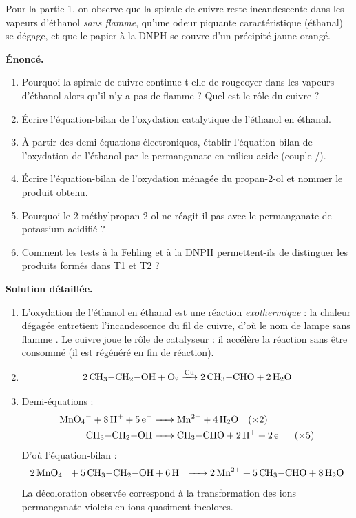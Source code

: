 \documentclass[11pt]{article}
\newcommand{\cle}[1]{{\popxbold\color{popdark}#1}}
\newcounter{popsec}
\newcounter{popsub}
\newcommand{\courssub}[1]{%
  \stepcounter{popsub}%
  \par\vspace{9pt}\noindent{\popxbold\fontsize{11.5}{13}\selectfont\color{popink}{\color{poporange}\thepopsec.\thepopsub}\hspace{6pt}#1}\par\nopagebreak\vspace{4pt}
}
\begin{document}
Pour la partie 1, on observe que la spirale de cuivre reste incandescente dans les vapeurs d'éthanol \emph{sans flamme}, qu'une odeur piquante caractéristique (éthanal) se dégage, et que le papier à la DNPH se couvre d'un précipité jaune-orangé.

\courssub{Exploitation}

\begin{exoresolu}
\textbf{Énoncé.}
\begin{enumerate}
\item Pourquoi la spirale de cuivre continue-t-elle de rougeoyer dans les vapeurs d'éthanol alors qu'il n'y a pas de flamme ? Quel est le rôle du cuivre ?
\item Écrire l'équation-bilan de l'oxydation catalytique de l'éthanol en éthanal.
\item À partir des demi-équations électroniques, établir l'équation-bilan de l'oxydation de l'éthanol par le permanganate en milieu acide (couple /).
\item Écrire l'équation-bilan de l'oxydation ménagée du propan-2-ol et nommer le produit obtenu.
\item Pourquoi le 2-méthylpropan-2-ol ne réagit-il pas avec le permanganate de potassium acidifié ?
\item Comment les tests à la Fehling et à la DNPH permettent-ils de distinguer les produits formés dans T1 et T2 ?
\end{enumerate}
\tcblower
\textbf{Solution détaillée.}
\begin{enumerate}
\item L'oxydation de l'éthanol en éthanal est une réaction \emph{exothermique} : la chaleur dégagée entretient l'incandescence du fil de cuivre, d'où le nom de \og lampe sans flamme \fg. Le cuivre joue le rôle de \cle{catalyseur} : il accélère la réaction sans être consommé (il est régénéré en fin de réaction).
\item \[ 2\,\ce{CH3-CH2-OH} + \ce{O2} \xrightarrow{\ce{Cu}} 2\,\ce{CH3-CHO} + 2\,\ce{H2O} \]
\item Demi-équations :
\begin{align*}
\ce{MnO4- + 8H+ + 5e- &-> Mn^2+ + 4H2O} \quad (\times 2)\\
\ce{CH3-CH2-OH &-> CH3-CHO + 2H+ + 2e-} \quad (\times 5)
\end{align*}
D'où l'équation-bilan :
\[ \ce{2MnO4- + 5CH3-CH2-OH + 6H+ -> 2Mn^2+ + 5CH3-CHO + 8H2O} \]
La décoloration observée correspond à la transformation des ions permanganate violets en ions  quasiment incolores.

\end{enumerate}
\end{exoresolu}
\end{document}
